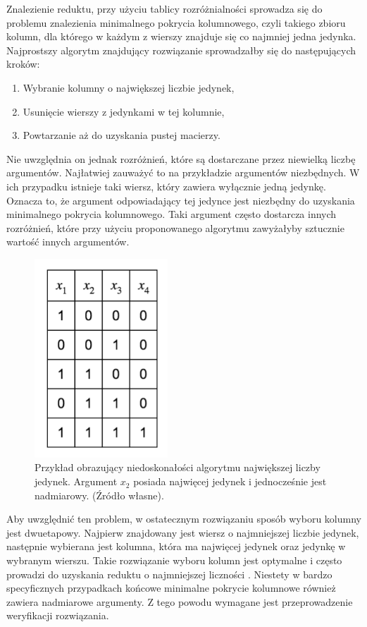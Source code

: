 Znalezienie reduktu,
przy użyciu tablicy rozróżnialności sprowadza się do problemu znalezienia minimalnego pokrycia kolumnowego,
czyli takiego zbioru kolumn,
dla którego w każdym z wierszy znajduje się co najmniej jedna jedynka.
Najprostszy algorytm znajdujący rozwiązanie sprowadzałby się do następujących kroków:
\begin{enumerate}
\item Wybranie kolumny o największej liczbie jedynek,
\item Usunięcie wierszy z jedynkami w tej kolumnie,
\item Powtarzanie aż do uzyskania pustej macierzy.
\end{enumerate}
Nie uwzględnia on jednak rozróżnień,
które są dostarczane przez niewielką liczbę argumentów.
Najłatwiej zauważyć to na przykładzie argumentów niezbędnych.
W ich przypadku istnieje taki wiersz,
który zawiera wyłącznie jedną jedynkę.
Oznacza to,
że argument odpowiadający tej jedynce jest niezbędny do uzyskania minimalnego pokrycia kolumnowego.
Taki argument często dostarcza innych rozróżnień,
które przy użyciu proponowanego algorytmu zawyżałyby sztucznie wartość innych argumentów.

\begin{figure}[H]
\centering
\includegraphics[width = 5cm]{chapter02/required-arguments.png}
\caption{Przykład obrazujący niedoskonałości algorytmu największej liczby jedynek.
Argument $x_2$ posiada najwięcej jedynek i jednocześnie jest nadmiarowy. (Źródło własne).}
\end{figure}

Aby uwzględnić ten problem,
w ostatecznym rozwiązaniu sposób wyboru kolumny jest dwuetapowy.
Najpierw znajdowany jest wiersz o najmniejszej liczbie jedynek,
następnie wybierana jest kolumna,
która ma najwięcej jedynek oraz jedynkę w wybranym wierszu.
Takie rozwiązanie wyboru kolumn jest optymalne i często prowadzi do uzyskania reduktu o najmniejszej liczności \cite{unate-artykul}.
Niestety w bardzo specyficznych przypadkach końcowe minimalne pokrycie kolumnowe również zawiera nadmiarowe argumenty.
Z tego powodu wymagane jest przeprowadzenie weryfikacji rozwiązania.


